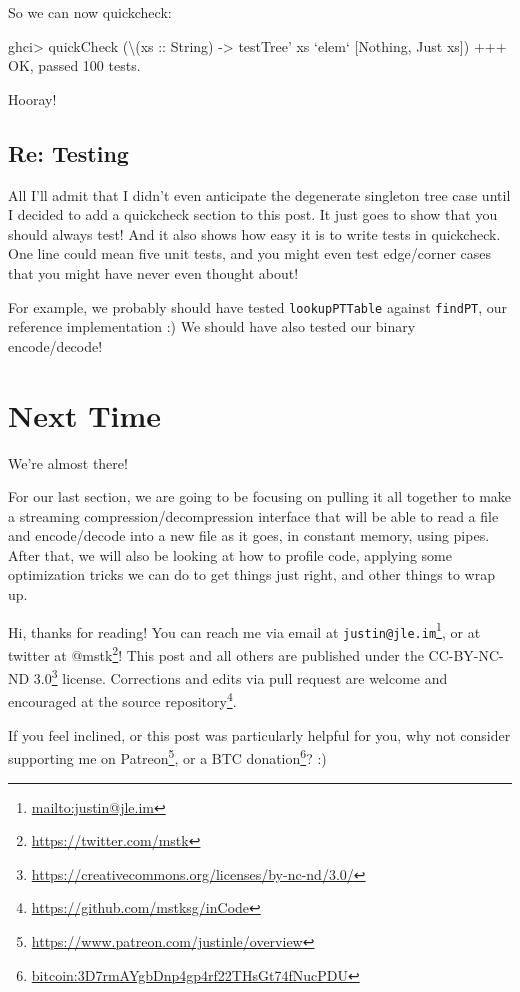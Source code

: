 \documentclass[]{article}
\newenvironment{Shaded}{}{}
\newcommand{\DataTypeTok}[1]{\textcolor[rgb]{0.56,0.13,0.00}{#1}}
\newcommand{\DecValTok}[1]{\textcolor[rgb]{0.25,0.63,0.44}{#1}}
\newcommand{\FunctionTok}[1]{\textcolor[rgb]{0.02,0.16,0.49}{#1}}
\newcommand{\NormalTok}[1]{#1}
\newcommand{\OtherTok}[1]{\textcolor[rgb]{0.00,0.44,0.13}{#1}}
\renewcommand{\href}[2]{#2\footnote{\url{#1}}}
\begin{document}
So we can now quickcheck:

\begin{Shaded}
\begin{Highlighting}[]
\NormalTok{ghci}\FunctionTok{>}\NormalTok{ quickCheck (\textbackslash{}(}\OtherTok{xs ::} \DataTypeTok{String}\NormalTok{) }\OtherTok{->}\NormalTok{ testTree' xs }\OtherTok{`elem`}\NormalTok{ [}\DataTypeTok{Nothing}\NormalTok{, }\DataTypeTok{Just}\NormalTok{ xs])}
\FunctionTok{+++} \DataTypeTok{OK}\NormalTok{, passed }\DecValTok{100}\NormalTok{ tests}\FunctionTok{.}
\end{Highlighting}
\end{Shaded}

Hooray!

\hypertarget{re-testing}{%
\subsection{Re: Testing}\label{re-testing}}

All I'll admit that I didn't even anticipate the degenerate singleton tree case
until I decided to add a quickcheck section to this post. It just goes to show
that you should always test! And it also shows how easy it is to write tests in
quickcheck. One line could mean five unit tests, and you might even test
edge/corner cases that you might have never even thought about!

For example, we probably should have tested \texttt{lookupPTTable} against
\texttt{findPT}, our reference implementation :) We should have also tested our
binary encode/decode!

\hypertarget{next-time}{%
\section{Next Time}\label{next-time}}

We're almost there!

For our last section, we are going to be focusing on pulling it all together to
make a streaming compression/decompression interface that will be able to read a
file and encode/decode into a new file as it goes, in constant memory, using
pipes. After that, we will also be looking at how to profile code, applying some
optimization tricks we can do to get things just right, and other things to wrap
up.

Hi, thanks for reading! You can reach me via email at
\href{mailto:justin@jle.im}{\nolinkurl{justin@jle.im}}, or at twitter at
\href{https://twitter.com/mstk}{@mstk}! This post and all others are published
under the \href{https://creativecommons.org/licenses/by-nc-nd/3.0/}{CC-BY-NC-ND
3.0} license. Corrections and edits via pull request are welcome and encouraged
at \href{https://github.com/mstksg/inCode}{the source repository}.

If you feel inclined, or this post was particularly helpful for you, why not
consider \href{https://www.patreon.com/justinle/overview}{supporting me on
Patreon}, or a \href{bitcoin:3D7rmAYgbDnp4gp4rf22THsGt74fNucPDU}{BTC donation}?
:)
\end{document}
